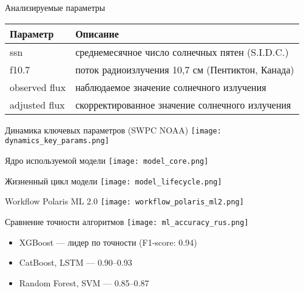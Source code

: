 \documentclass[aspectratio=43]{beamer}
\begin{document}
\begin{frame}{Анализируемые параметры}
  \begin{tabular}{@{}l l@{}}
    \toprule
    \textbf{Параметр} & \textbf{Описание} \\
    \midrule
    ssn & среднемесячное число солнечных пятен (S.I.D.C.) \\
    f10.7 & поток радиоизлучения 10,7 см (Пентиктон, Канада) \\
    observed flux & наблюдаемое значение солнечного излучения \\
    adjusted flux & скорректированное значение солнечного излучения \\
    \bottomrule
  \end{tabular}
\end{frame}

\begin{frame}{Динамика ключевых параметров (SWPC NOAA)}
  \centering
  \texttt{[image: dynamics\_key\_params.png]}
\end{frame}

\begin{frame}{Ядро используемой модели}
  \centering
  \texttt{[image: model\_core.png]}
\end{frame}

\begin{frame}{Жизненный цикл модели}
  \centering
  \texttt{[image: model\_lifecycle.png]}
\end{frame}

\begin{frame}{Workflow Polaris ML 2.0}
  \centering
  \texttt{[image: workflow\_polaris\_ml2.png]}
\end{frame}

\begin{frame}{Сравнение точности алгоритмов}
  \centering
  \texttt{[image: ml\_accuracy\_rus.png]}
  \vspace{1em}
  \begin{itemize}
    \item XGBoost --- лидер по точности (F1-score: 0.94)
    \item CatBoost, LSTM --- 0.90--0.93
    \item Random Forest, SVM --- 0.85--0.87
  \end{itemize}
\end{frame}
\end{document}
